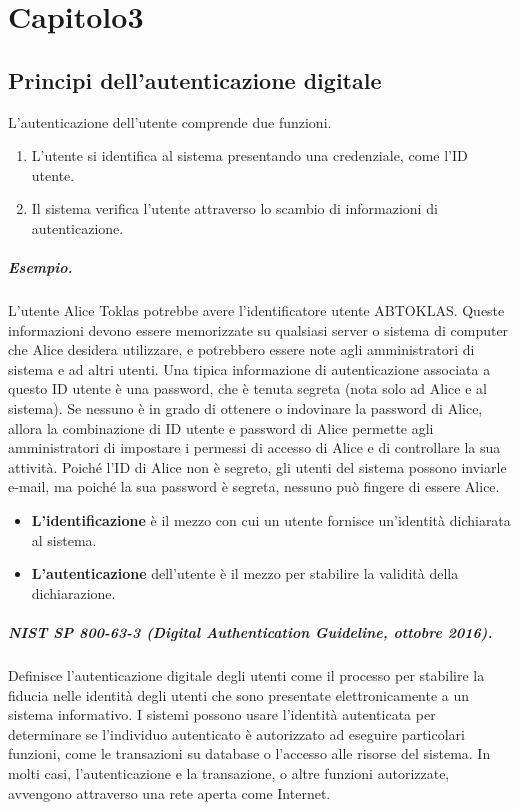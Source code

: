 \newpage
\chapter{Capitolo3}
\section{Principi dell'autenticazione digitale}
L'autenticazione dell'utente comprende due funzioni.

\begin{enumerate}
    \centering
    \item L'utente si identifica al sistema presentando una credenziale, come l'ID utente.
    
    \item Il sistema verifica l'utente attraverso lo scambio di informazioni di autenticazione.
\end{enumerate}

\paragraph{Esempio.} L'utente Alice Toklas potrebbe avere l'identificatore utente ABTOKLAS. Queste informazioni devono essere memorizzate su qualsiasi server o sistema di computer che Alice desidera utilizzare, e potrebbero essere note agli amministratori di sistema e ad altri utenti. Una tipica informazione di autenticazione associata a questo ID utente è una password, che è tenuta segreta (nota solo ad Alice e al sistema). Se nessuno è in grado di ottenere o indovinare la password di Alice, allora la combinazione di ID utente e password di Alice permette agli amministratori di impostare i permessi di accesso di Alice e di controllare la sua attività. Poiché l'ID di Alice non è segreto, gli utenti del sistema possono inviarle e-mail, ma poiché la sua password è segreta, nessuno può fingere di essere Alice.

\begin{itemize}

    \item \textbf{L'identificazione} è il mezzo con cui un utente fornisce un'identità dichiarata al sistema.
    
    \item \textbf{L'autenticazione} dell'utente è il mezzo per stabilire la validità della dichiarazione.
    
\end{itemize}

\paragraph{NIST SP 800-63-3 (Digital Authentication Guideline, ottobre 2016).}
Definisce l'autenticazione digitale degli utenti come il processo per stabilire la fiducia nelle identità degli utenti che sono presentate elettronicamente a un sistema informativo. I sistemi possono usare l'identità autenticata per determinare se l'individuo autenticato è autorizzato ad eseguire particolari funzioni, come le transazioni su database o l'accesso alle risorse del sistema. In molti casi, l'autenticazione e la transazione, o altre funzioni autorizzate, avvengono attraverso una rete aperta come Internet.

